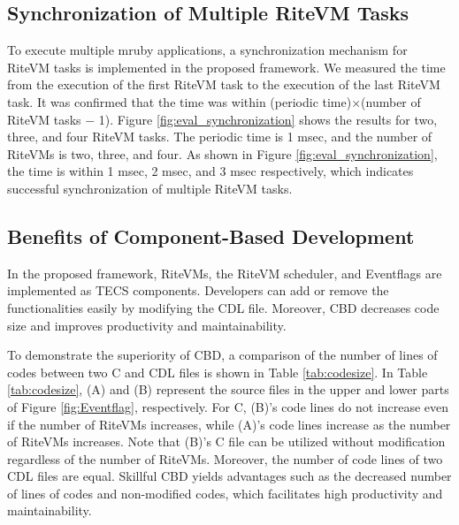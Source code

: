 \documentclass[S,R,E]{article/compsoft}
\begin{document}
\subsection{Synchronization of Multiple RiteVM Tasks}
To execute multiple mruby applications, a synchronization mechanism for RiteVM tasks is implemented in the proposed framework.
We measured the time from the execution of the first RiteVM task to the execution of the last RiteVM task.
It was confirmed that the time was within (periodic time)$\times$(number of RiteVM tasks $-$ 1).
Figure \ref{fig:eval_synchronization} shows the results for two, three, and four RiteVM tasks.
The periodic time is 1 msec, and the number of RiteVMs is two, three, and four.
As shown in Figure \ref{fig:eval_synchronization}, the time is within 1 msec, 2 msec, and 3 msec respectively, which indicates successful synchronization of multiple RiteVM tasks.




\subsection{Benefits of Component-Based Development}
In the proposed framework, RiteVMs, the RiteVM scheduler, and Eventflags are implemented as TECS components.
Developers can add or remove the functionalities easily by modifying the CDL file.
Moreover, CBD decreases code size and improves productivity and maintainability.

To demonstrate the superiority of CBD, a comparison of the number of lines of codes between two C and CDL files is shown in Table \ref{tab:codesize}.
In Table \ref{tab:codesize}, (A) and (B) represent the source files in the upper and lower parts of Figure \ref{fig:Eventflag}, respectively. 
For C, (B)'s code lines do not increase even if the number of RiteVMs increases, while (A)'s code lines increase as the number of RiteVMs increases.
Note that (B)'s C file can be utilized without modification regardless of the number of RiteVMs.
Moreover, the number of code lines of two CDL files are equal.
Skillful CBD yields advantages such as the decreased number of lines of codes and non-modified codes, which facilitates high productivity and maintainability.
\end{document}
